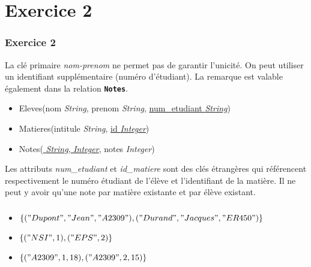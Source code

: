 \documentclass[svgnames,11pt]{beamer}
\begin{document}
\section{Exercice 2}
\begin{frame}
    \frametitle{Exercice 2}

    La clé primaire \emph{nom-prenom} ne permet pas de garantir l'unicité. On peut utiliser un identifiant supplémentaire (numéro d'étudiant). La remarque est valable également dans la relation \textbf{\texttt{Notes}}.
    \begin{itemize}
        \item Eleves(nom \emph{String}, prenom \emph{String}, \underline{num\_etudiant \emph{String}})
        \item Matieres(intitule \emph{String}, \underline{id \emph{Integer}})
        \item Notes(\underline{ \emph{String},  \emph{Integer}}, notes \emph{Integer})
    \end{itemize}
    Les attributs \emph{num\_etudiant} et \emph{id\_matiere} sont des clés étrangères qui référencent respectivement le numéro étudiant de l'élève et l'identifiant de la matière. Il ne peut y avoir qu'une note par matière existante et par élève existant.    

\end{frame}
\begin{frame}
    \frametitle{}

    \begin{itemize}
        \item $\{("Dupont", "Jean", "A2309"), ("Durand", "Jacques", "ER450")\}$
        \item $\{("NSI", 1), ("EPS", 2)\}$
        \item $\{("A2309", 1, 18), ("A2309", 2, 15)\}$
    \end{itemize}    

\end{frame}
\end{document}
